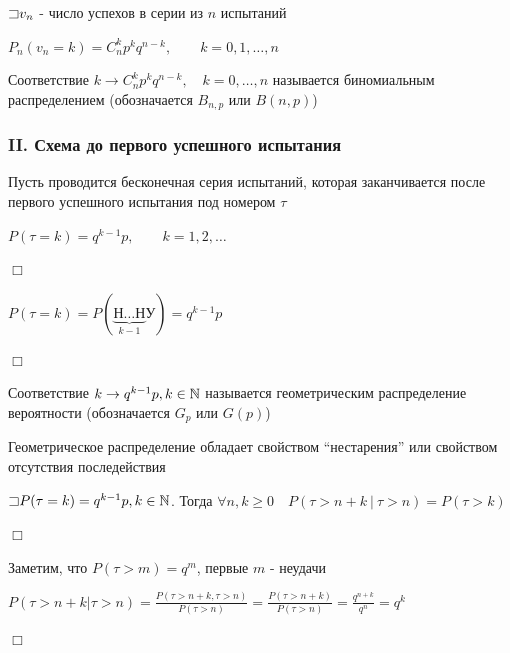 \documentclass[12pt]{article}
\begin{document}
    $\mathord{\sqsupset} v_n$ - число успехов в серии из $n$ испытаний

    $P_n(v_n = k) = C^k_n p^k q^{n - k}, \quad\quad k = 0, 1, \dots, n$

    \hypertarget{binomialdistribution}{}

    \Def Соответствие $k \rightarrow C^k_n p^k q^{n - k}, \quad k = 0, \dots, n$ называется биномиальным распределением
    (обозначается $B_{n,p}$ или $B(n, p)$)

    \hypertarget{untilfirstsuccessschema}{}

    \subsubsection{II. Схема до первого успешного испытания}

    Пусть проводится бесконечная серия испытаний, которая заканчивается после первого успешного испытания
    под номером $\tau$

    \begin{MyTheorem}
        \Ths $P(\tau = k) = q^{k - 1} p, \quad\quad k = 1, 2, \dots$
    \end{MyTheorem}

    \begin{MyProof}
        $\Box$

        $P(\tau = k) = P(\underset{k - 1}{\underbrace{\text{Н}\dots\text{Н}}}\text{У}) = q^{k - 1}p$

        $\Box$
    \end{MyProof}

    \hypertarget{geometricdistribution}{}

    \Def Соответствие $k \rightarrow q^{k - 1} p, k \in \mathbb{N}$ называется геометрическим
    распределение вероятности (обозначается $G_p$ или $G(p)$)

    \Nota Геометрическое распределение обладает свойством \enquote{нестарения} или свойством отсутствия
    последействия

    \begin{MyTheorem}
        \Ths $\mathord{\sqsupset} P(\tau = k) = q^{k - 1} p, k \in \mathbb{N}$. Тогда $\forall n, k \geq 0 \quad P(\tau > n + k \ | \ \tau > n) = P(\tau > k)$
    \end{MyTheorem}

    \begin{MyProof}
        $\Box$

        Заметим, что $P(\tau > m) = q^m$, первые $m$ - неудачи

        $P(\tau > n + k | \tau > n) = \frac{P(\tau > n + k, \tau > n)}{P(\tau > n)} = \frac{P(\tau > n + k)}{P(\tau > n)} = \frac{q^{n + k}}{q^n} = q^k$

        $\Box$
    \end{MyProof}
\end{document}
